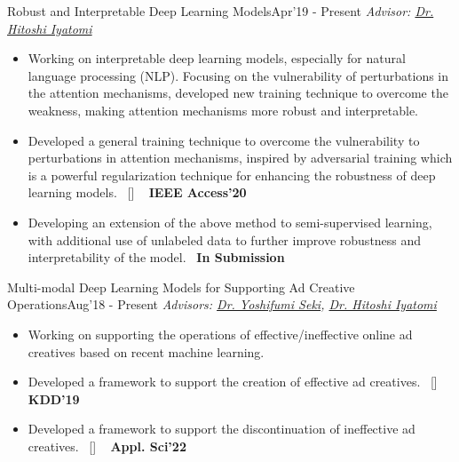
\begin{projects}

	\project
	{Robust and Interpretable Deep Learning Models}{Apr'19 - Present}
	{
		\textit{Advisor:  \href{https://iyatomi-lab.info/english/people/2013-6-8}{Dr. Hitoshi Iyatomi}}
	}
	{\begin{itemize}
			\setlength\itemsep{0.3em}
			\item Working on interpretable deep learning models, especially for natural language processing (NLP). Focusing on the vulnerability of perturbations in the attention mechanisms, developed new training technique to overcome the weakness, making attention mechanisms more robust and interpretable.
			\item Developed a general training technique to overcome the vulnerability to perturbations in attention mechanisms, inspired by adversarial training which is a powerful regularization technique for enhancing the robustness of deep learning models.~ [\href{http://shunk031.github.io/attention-meets-perturbation/}{\small{\websiteSymbol}}] ~ {\small{\lbrack\textbf{{IEEE Access'20}}\rbrack}}
			\item Developing an extension of the above method to semi-supervised learning, with additional use of unlabeled data to further improve robustness and interpretability of the model.~ {\small{\lbrack\textbf{{In Submission}}\rbrack}}
		\end{itemize}}

	\project
	{Multi-modal Deep Learning Models for Supporting Ad Creative Operations}{Aug'18 - Present}
	{
		\textit{Advisors:  \href{https://scholar.google.com/citations?user=LoZ7VeYAAAAJ}{Dr. Yoshifumi Seki}, \href{https://iyatomi-lab.info/english/people/2013-6-8}{Dr. Hitoshi Iyatomi}}
	}
	{\begin{itemize}
			\setlength\itemsep{0.3em}
			\item Working on supporting the operations of effective/ineffective online ad creatives based on recent machine learning.
			\item Developed a framework to support the creation of effective ad creatives.~ [\href{https://github.com/shunk031/Multi-task-Conditional-Attention-Networks}{\small{\githubSymbol}}] ~ {\small{\lbrack\textbf{{KDD'19}}\rbrack}}
			\item Developed a framework to support the discontinuation of ineffective ad creatives.~ [\href{https://www.mdpi.com/2076-3417/12/7/3594}{\small{\websiteSymbol}}] ~ {\small{\lbrack\textbf{{Appl. Sci'22}}\rbrack}}
		\end{itemize}}


\end{projects}
